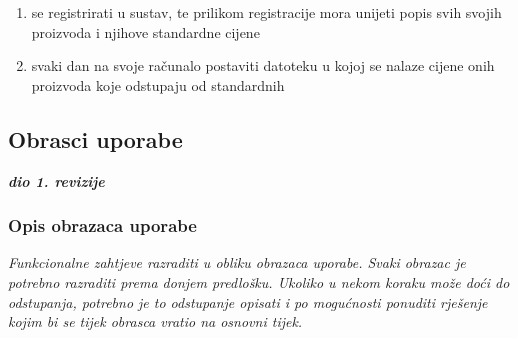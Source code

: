 \begin{packed_enum}
				\begin{enumerate}
					
					\item se registrirati u sustav, te prilikom registracije mora unijeti popis svih svojih proizvoda i njihove standardne cijene
					\item svaki dan na svoje računalo postaviti datoteku u kojoj se nalaze cijene onih proizvoda koje odstupaju od standardnih
        	        
                        
					
				\end{enumerate}

    
			\end{packed_enum}
			
			\eject 
			
			
				
			\subsection{Obrasci uporabe}
				
				\textbf{\textit{dio 1. revizije}}
				
				\subsubsection{Opis obrazaca uporabe}
					\textit{Funkcionalne zahtjeve razraditi u obliku obrazaca uporabe. Svaki obrazac je potrebno razraditi prema donjem predlošku. Ukoliko u nekom koraku može doći do odstupanja, potrebno je to odstupanje opisati i po mogućnosti ponuditi rješenje kojim bi se tijek obrasca vratio na osnovni tijek.}\\
					

